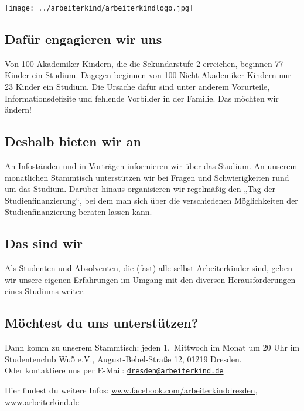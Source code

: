 \texttt{[image: ../arbeiterkind/arbeiterkindlogo.jpg]}
\subsection*{Dafür engagieren wir uns}
Von 100 Akademiker-Kindern, die die Sekundarstufe 2 erreichen,
beginnen 77 Kinder ein Studium.
Dagegen beginnen von 100 Nicht-Akademiker-Kindern nur 23 Kinder ein Studium.
Die Ursache dafür sind unter anderem Vorurteile, Informationsdefizite und fehlende Vorbilder in der Familie.  
Das möchten wir ändern!

\subsection*{Deshalb bieten wir an}
An Infoständen und in Vorträgen informieren wir über das Studium.
An unserem monatlichen Stammtisch unterstützen wir bei Fragen und Schwierigkeiten rund um das Studium.
Darüber hinaus organisieren wir regelmäßig den
„Tag der Studienfinanzierung“,
bei dem man sich über die verschiedenen Möglichkeiten der Studienfinanzierung beraten lassen kann.

\subsection*{Das sind wir}
Als Studenten und Absolventen, die (fast) alle selbst Arbeiterkinder sind,
geben wir unsere eigenen Erfahrungen im Umgang mit den diversen Herausforderungen eines Studiums weiter. 

\subsection*{Möchtest du uns unterstützen?}
Dann komm zu unserem Stammtisch: jeden 1.\ Mittwoch im Monat um 20 Uhr im Studentenclub Wu5 e.V.,
August-Bebel-Straße 12, 01219 Dresden.\\
Oder kontaktiere uns per E-Mail: \href{mailto:dresden@arbeiterkind.de}{\nolinkurl{dresden@arbeiterkind.de}}

Hier findest du weitere Infos:
\url{www.facebook.com/arbeiterkinddresden},
\url{www.arbeiterkind.de}
